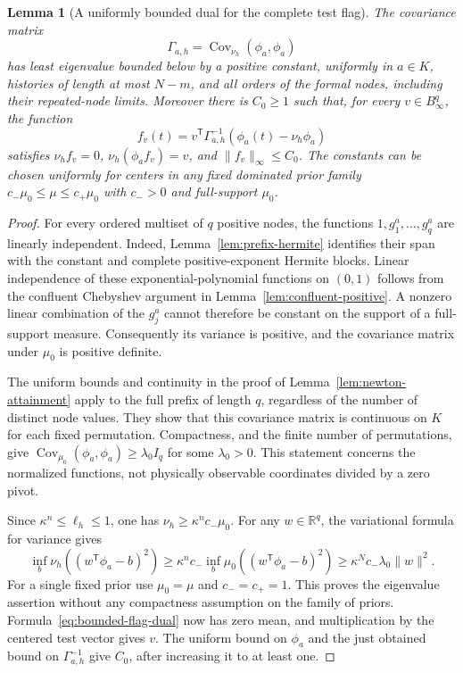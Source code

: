 \documentclass[11pt]{amsart}
\newtheorem{lemma}[theorem]{Lemma}
\theoremstyle{definition}\newtheorem{definition}[theorem]{Definition}
\theoremstyle{remark}\newtheorem{remark}[theorem]{Remark}
\newcommand{\R}{\mathbb R}\newcommand{\N}{\mathbb N}\newcommand{\C}{\mathbb C}
\begin{document}
\begin{lemma}[A uniformly bounded dual for the complete test flag]
\label{lem:flag-covariance}
The covariance matrix
\[
 \Gamma_{a,h}=\operatorname{Cov}_{\nu_h}(\phi_a,\phi_a)
\]
has least eigenvalue bounded below by a positive constant, uniformly in
$a\in K$, histories of length at most $N-m$, and all orders of the
formal nodes, including their repeated-node limits. Moreover there is
$C_0\ge1$ such that, for every $v\in B_\infty^q$, the function
\begin{equation}\label{eq:bounded-flag-dual}
 f_v(t)=v^{\mathsf T}\Gamma_{a,h}^{-1}
                 (\phi_a(t)-\nu_h\phi_a)
\end{equation}
satisfies $\nu_h f_v=0$, $\nu_h(\phi_a f_v)=v$, and
$\|f_v\|_\infty\le C_0$. The constants can be chosen uniformly for
centers in any fixed dominated prior family
$c_-\mu_0\le\mu\le c_+\mu_0$ with $c_->0$ and full-support $\mu_0$.
\end{lemma}
\begin{proof}
For every ordered multiset of $q$ positive nodes, the functions
$1,g_1^a,\ldots,g_q^a$ are linearly independent. Indeed,
Lemma~\ref{lem:prefix-hermite} identifies their span with the constant
and complete positive-exponent Hermite blocks. Linear independence of
these exponential-polynomial functions on $(0,1)$ follows from the
confluent Chebyshev argument in Lemma~\ref{lem:confluent-positive}.
A nonzero linear combination of the $g_j^a$ cannot therefore be constant
on the support of a full-support measure. Consequently its variance is
positive, and the covariance matrix under $\mu_0$ is positive definite.

The uniform bounds and continuity in the proof of
Lemma~\ref{lem:newton-attainment} apply to the full prefix of length
$q$, regardless of the number of distinct node values. They show that
this covariance matrix is continuous on $K$ for each fixed permutation.
Compactness, and the finite number of permutations, give
$\operatorname{Cov}_{\mu_0}(\phi_a,\phi_a)\ge\lambda_0 I_q$
for some $\lambda_0>0$. This statement concerns the normalized functions,
not physically observable coordinates divided by a zero pivot.

Since $\kappa^n\le\ell_h\le1$, one has
$\nu_h\ge\kappa^n c_-\mu_0$. For any $w\in\R^q$, the variational
formula for variance gives
\[
 \inf_b\nu_h((w^{\mathsf T}\phi_a-b)^2)
 \ge\kappa^n c_-\inf_b\mu_0((w^{\mathsf T}\phi_a-b)^2)
 \ge\kappa^N c_-\lambda_0\|w\|^2.
\]
For a single fixed prior use $\mu_0=\mu$ and $c_-=c_+=1$.
This proves the eigenvalue assertion without any compactness assumption
on the family of priors. Formula~\eqref{eq:bounded-flag-dual} now has
zero mean, and multiplication by the centered test vector gives $v$.
The uniform bound on $\phi_a$ and the just obtained bound on
$\Gamma_{a,h}^{-1}$ give $C_0$, after increasing it to at least one.
\end{proof}
\end{document}
